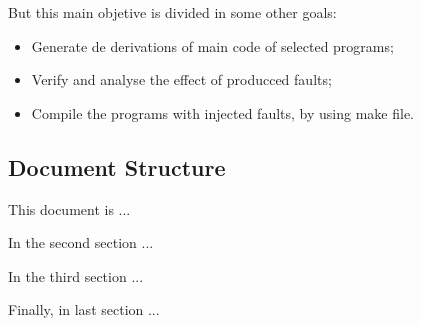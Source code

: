But this main objetive is divided in some other goals:

\begin{itemize}
	\item Generate de derivations of main code of selected programs;
	\item Verify and analyse the effect of producced faults;
	\item Compile the programs with injected faults, by using make file.
\end{itemize}



\subsection{Document Structure}

This document is ...

In the second section ...

In the third section ...

Finally, in last section ...